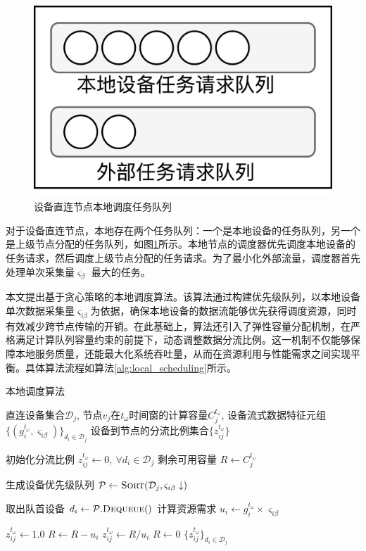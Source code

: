\begin{figure}[h]
  \centering
  \includegraphics[width=0.4\linewidth]{pics/3-10本地调度.png}
  \caption{设备直连节点本地调度任务队列}
  \label{fig:3-10local}
\end{figure}

对于设备直连节点，本地存在两个任务队列：一个是本地设备的任务队列，另一个是上级节点分配的任务队列，如图\ref{fig:3-10local}所示。本地节点的调度器优先调度本地设备的任务请求，然后调度上级节点分配的任务请求。为了最小化外部流量，调度器首先处理单次采集量$\varsigma_\beta$ 最大的任务。

本文提出基于贪心策略的本地调度算法。该算法通过构建优先级队列，以本地设备单次数据采集量$\varsigma_{i\beta}$为依据，确保本地设备的数据流能够优先获得调度资源，同时有效减少跨节点传输的开销。在此基础上，算法还引入了弹性容量分配机制，在严格满足计算队列容量约束的前提下，动态调整数据分流比例。这一机制不仅能够保障本地服务质量，还能最大化系统吞吐量，从而在资源利用与性能需求之间实现平衡。具体算法流程如算法\ref{alg:local_scheduling}所示。

\begin{algorithm}[ht]
\caption{本地调度算法}
\label{alg:local_scheduling}
\begin{algorithmic}[1]
\REQUIRE  
  直连设备集合$\mathcal{D}_j$,  节点$v_j$在$t_\omega$时间窗的计算容量$C^{t_\omega}_j$, 设备流式数据特征元组$\{(g_i^{t_\omega}, \varsigma_{i\beta})\}_{d_i \in \mathcal{D}_j}$
\ENSURE  
  设备到节点的分流比例集合$\{z_{ij}^{t_\omega}\}$

\STATE 初始化分流比例 $z_{ij}^{t_\omega} \leftarrow 0,\ \forall d_i \in \mathcal{D}_j$  
\STATE 剩余可用容量 $R \leftarrow C_j^{t_\omega}$  

\STATE 生成设备优先级队列 $\mathcal{P} \leftarrow \textsc{Sort}(\mathcal{D}_j, \varsigma_{i\beta} \downarrow)$  

  \STATE 取出队首设备 $d_i \leftarrow \mathcal{P}.\textsc{Dequeue}()$
  \STATE 计算资源需求 $u_i \leftarrow g_i^{t_\omega} \times \varsigma_{i\beta}$ 
  
    \STATE $z_{ij}^{t_\omega} \leftarrow 1.0$ 
    \STATE $R \leftarrow R - u_i$ 
  \ELSE
    \STATE $z_{ij}^{t_\omega} \leftarrow R / u_i$ 
    \STATE $R \leftarrow 0$ 
  \ENDIF
\ENDWHILE
\RETURN $\{z_{ij}^{t_\omega}\}_{d_i \in \mathcal{D}_j}$
\end{algorithmic}
\end{algorithm}

